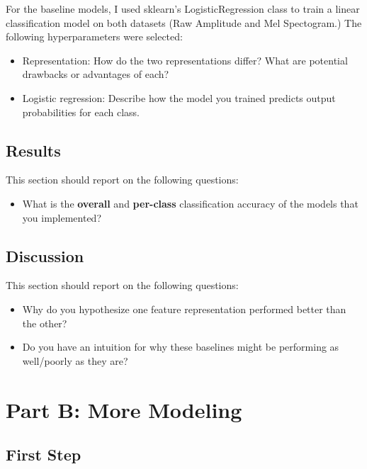 \documentclass[11pt]{article}
\begin{document}
For the baseline models, I used sklearn's LogisticRegression class to train a linear classification model on both datasets (Raw Amplitude and Mel Spectogram.) The following hyperparameters were selected:

  \begin{itemize}
  \item Representation: How do the two representations differ? What are potential drawbacks or advantages of each?
  
  \item Logistic regression: Describe how the model you trained predicts output probabilities for each class.

  \end{itemize}

\subsection{Results}

This section should report on the following questions: 

\begin{itemize}
\item  What is the \textbf{overall} and \textbf{per-class} classification accuracy of the models that you implemented?
\end{itemize}

\subsection{Discussion}

This section should report on the following questions: 

\begin{itemize}
  \item Why do you hypothesize one feature representation performed better than the other?  
  \item Do you have an intuition for why these baselines might be performing as well/poorly as they are?
  \end{itemize}

\section{Part B: More Modeling}

\subsection{First Step}
\end{document}
